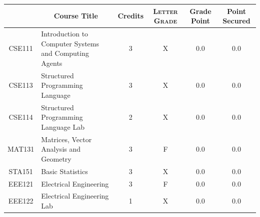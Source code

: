 \documentclass[11pt]{article}
\newcommand*{\numtwo}[1]{\pgfmathprintnumber[
                    fixed, precision=2, fixed zerofill=true]{#1}}
\begin{document}
                \begin{center}
                    \renewcommand{\arraystretch}{1.08}
                    
                \begin{tabular}{|c|l|c|>{\scshape}c|c|c|}
                \hline  \rule[-1ex]{0pt}{3.5ex} {\centering{\bf Course Code}} &  \multicolumn{1}{c|}{\textbf{Course Title}}  & {\bf Credits} & {\bf Letter Grade} & {\bf Grade Point} & {\bf Point Secured}  \\ 
                \hline   CSE111 &  Introduction to Computer Systems and Computing Agents		 & 3 & X & 0.0 & 0.0 \\ %
                \hline   CSE113 &  Structured Programming Language		 & 3 & X & 0.0 & 0.0 \\ %
                \hline   CSE114 &  Structured Programming Language Lab		 & 2 & X & 0.0 & 0.0 \\ %
                \hline   MAT131 &  Matrices, Vector Analysis and Geometry		 & 3 & F & 0.0 & 0.0 \\ %
                \hline   STA151 &  Basic Statistics		 & 3 & X & 0.0 & 0.0 \\ %
                \hline   EEE121 &  Electrical Engineering		 & 3 & F & 0.0 & 0.0 \\ %
                \hline   EEE122 &  Electrical Engineering Lab		 & 1 & X & 0.0 & 0.0 \\ %

\hline                %
                \end{tabular}
                \end{center}
                \renewcommand{\arraystretch}{1.03}
\end{document}
